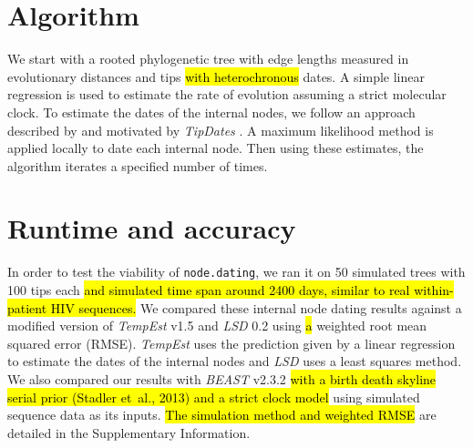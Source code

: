 \documentclass{bioinfo}
\newcommand{\code}[1]{{\tt #1}}
\newcommand{\edit}[1]{\hl{#1}}
\begin{document}
\vspace*{-18pt}

\section{Algorithm} \label{sec:alg}
We start with a rooted phylogenetic tree with edge lengths measured in evolutionary distances and tips \edit{with heterochronous} dates.
A simple linear regression is used to estimate the rate of evolution assuming a strict molecular clock.
To estimate the dates of the internal nodes, we follow an approach described by \cite{Felsenstein81} and motivated by \emph{TipDates} \citep{TipDates}.
A maximum likelihood method is applied locally to date each internal node.
Then using these estimates, the algorithm iterates a specified number of times.

\vspace*{-18pt}

\section{Runtime and accuracy} \label{sec:tests}
In order to test the viability of \code{node.dating}, we ran it on 50 simulated trees with 100 tips each \edit{and simulated time span around 2400 days, similar to real within-patient HIV sequences.}
We compared these internal node dating results against a modified version of \emph{TempEst} v1.5 and \emph{LSD} 0.2 using \edit{a} weighted root mean squared error (RMSE).
\emph{TempEst} uses the prediction given by a linear regression to estimate the dates of the internal nodes and \emph{LSD} uses a least squares method.
We also compared our results with \emph{BEAST} v2.3.2 \edit{with a birth death skyline serial prior (Stadler et~al., 2013) and a strict clock model} using simulated sequence data as its inputs.
\edit{The simulation method and weighted RMSE} are detailed in the Supplementary Information.
\end{document}
